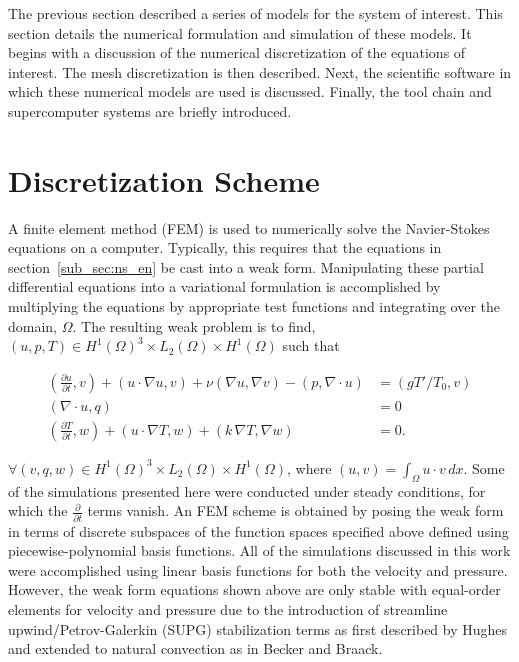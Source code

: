 \label{sec:software}

The previous section described a series of models 
for the system of interest. 
This section details the numerical formulation
and simulation of these models. It begins with a 
discussion of the numerical discretization of the equations 
of interest. The mesh discretization is then described. 
Next, the scientific software in which these numerical 
models are used is discussed. Finally, the tool
chain and supercomputer systems are briefly introduced. 

\section{Discretization Scheme}

A finite element method (FEM) is used to numerically solve the
Navier-Stokes equations on a computer. 
Typically, this requires that the equations
in section~\ref{sub_sec:ns_en} be cast into a weak form. Manipulating
these partial differential equations into a variational formulation is
accomplished by multiplying the equations by appropriate test functions
and integrating over the domain, $\Omega$. The resulting weak problem is
to find, $(u,p,T) \in H^1(\Omega)^3 \times L_2(\Omega) \times
H^1(\Omega)$ such that 

%
%
\begin{align}
  (\frac{\partial u}{\partial t}, v) + (u \cdot \nabla u,v) + \nu
   (\nabla u, \nabla v)  
  -(p,\nabla \cdot u) &= (gT'/T_0,v)
 \label{eqn:ns_weak} \\
 (\nabla \cdot u,q) &= 0
 \label{eqn:cont_weak} \\
 (\frac{\partial T}{\partial t}, w) + (u \cdot \nabla T, w) + (k \, \nabla
 T, \nabla w) &= 0.\label{eqn:en_weak}
\end{align}

$\forall (v,q,w) \in H^1(\Omega)^3 \times L_2(\Omega) \times
H^1(\Omega)$, where $(u,v) = \int_\Omega u \cdot v \, dx$.  
Some of the simulations presented here were conducted under
steady conditions, for which the $\frac{\partial}{\partial t}$ terms
vanish. An FEM scheme is obtained by posing the weak form in
terms of discrete subspaces of the function spaces specified above
defined using piecewise-polynomial basis functions. All of the
simulations discussed in this work were accomplished using 
linear basis functions for both the velocity and pressure. However, the
weak form equations shown above are only stable with equal-order
elements for velocity and pressure due to the introduction of streamline
upwind/Petrov-Galerkin (SUPG) stabilization terms as first described by
Hughes\cite{Hughes198685,supg} and extended to natural convection as in
Becker and Braack\cite{Becker2002428}.  

